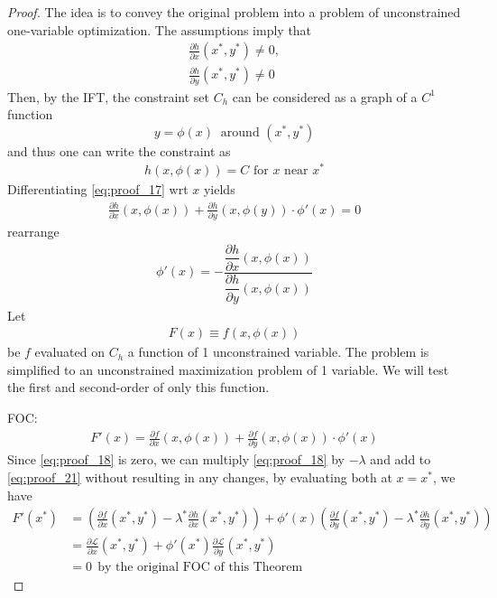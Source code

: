 \documentclass[10pt,a4paper]{book}
\theoremstyle{definition}\newtheorem{definition}{Definition}
\theoremstyle{definition}\newtheorem{fact}{Fact}
\theoremstyle{definition}\newtheorem{ex}{Ex.}
\theoremstyle{definition}\newtheorem{project}{Project}
\theoremstyle{definition}\newtheorem{problem}{Problem}
\theoremstyle{definition}\newtheorem{example}{Example}
\numberwithin{theorem}{chapter}
\numberwithin{corollary}{chapter}
\numberwithin{assumption}{chapter}
\numberwithin{definition}{chapter}
\numberwithin{prop}{chapter}
\numberwithin{notation}{chapter}
\numberwithin{problem}{chapter}
\numberwithin{example}{chapter}
\numberwithin{fact}{chapter}
\numberwithin{ex}{chapter}
\begin{document}
	\begin{proof}
		The idea is to convey the original problem into a problem of unconstrained one-variable optimization. The assumptions imply that
		\begin{align*}
			\frac{\partial h}{\partial x} (x^*,y^*) \neq 0, \\
			\frac{\partial h}{\partial y} (x^*,y^*) \neq 0
		\end{align*}
		Then, by the IFT, the constraint set $C_h$ can be considered as a graph of a $C^1$ function 
		\begin{equation}
			y = \phi (x) \ \text{ around } (x^*,y^*)
		\end{equation}
		and thus one can write the constraint as
		\begin{align} 
			h(x, \phi(x)) = C \text{ for $x$ near $x^*$} \label{eq:proof_17}
		\end{align}
		Differentiating \eqref{eq:proof_17} wrt $x$ yields
		\begin{align}
			\frac{\partial h}{\partial x} (x, \phi(x)) + \frac{\partial h}{\partial y} (x, \phi(y)) \cdot \phi'(x) = 0 \label{eq:proof_18}
		\end{align}
		rearrange
		\begin{align}
			\phi'(x) = - \dfrac{ \dfrac{\partial h}{\partial x} (x,\phi(x)) }{ \dfrac{\partial h}{\partial y} (x,\phi(x))}
		\end{align}
		Let 
		\begin{align}
			F(x)  \equiv f(x, \phi(x))
		\end{align}
		be $f$ evaluated on $C_h$ a function of 1 unconstrained variable. The problem is simplified to an unconstrained maximization problem of 1 variable. We will test the first and second-order of only this function. 
		
		FOC:
		\begin{align}
			F'(x) = \frac{\partial f}{\partial x} (x,\phi(x)) + \frac{\partial f}{\partial y} (x,\phi(x)) \cdot \phi'(x) \label{eq:proof_21}
		\end{align}
		Since \eqref{eq:proof_18} is zero, we can multiply \eqref{eq:proof_18} by $-\lambda$ and add to \eqref{eq:proof_21} without resulting in any changes, by evaluating both at $x=x^*$, we have
		\begin{align*}
			F'(x^*) &= \left( \frac{\partial f}{\partial x} (x^*,y^*) - \lambda^* \frac{\partial h}{\partial x} (x^*,y^*)  \right) + \phi'(x)  \left( \frac{\partial f}{\partial y} (x^*,y^*) - \lambda^* \frac{\partial h}{\partial y} (x^*,y^*)  \right) \\
			& = \frac{\partial \mathcal{L}}{\partial x} (x^*,y^*)+ \phi'(x^*) \frac{\partial \mathcal{L}}{\partial y} (x^*,y^*) \\
			& = 0 \ \ \text{by the original FOC of this Theorem}
		\end{align*}
		

\end{proof}
\end{document}

